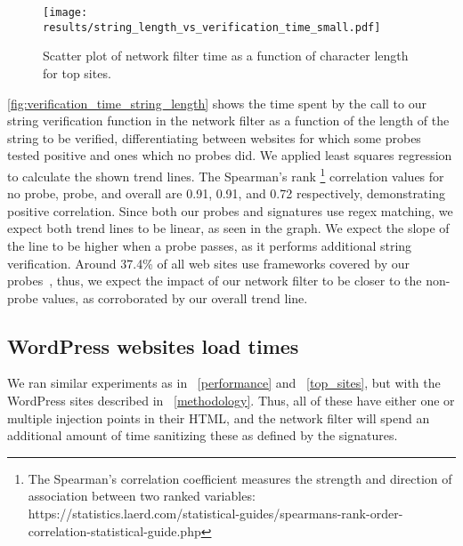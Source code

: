 \iffalse
\begin{figure}[h]
	\texttt{[image: results/density\_histogram\_filter\_slowdown\_small.pdf]}
	\caption{Density histogram of network filter slowdown for top sites.}
	\label{fig:histogram_slowdown}
\end{figure}


Figure ~\ref{fig:histogram_slowdown} shows a closer look at the distribution for the cold network filter slowdown on the top sites (same values as in \autoref{fig:overall_slowdown}). For this component, 87.6\% of the slowdown values are less than 10\%.
\fi

\begin{figure}[h]
	\texttt{[image: results/string\_length\_vs\_verification\_time\_small.pdf]}
	\caption{Scatter plot of network filter time as a function of character length for top sites.}
	\label{fig:verification_time_string_length}
\end{figure}

 \autoref{fig:verification_time_string_length} shows the time spent by the call to our string verification function in the network filter as a function of the length of the string to be verified, differentiating between websites for which some probes tested positive and ones which no probes did. We applied least squares regression to calculate the shown trend lines. The Spearman's rank \footnote{The Spearman's correlation coefficient measures the strength and direction of association between two ranked variables: https://statistics.laerd.com/statistical-guides/spearmans-rank-order-correlation-statistical-guide.php} correlation values for no probe, probe, and overall are 0.91, 0.91, and 0.72 respectively, demonstrating positive correlation. Since both our probes and signatures use regex matching, we expect both trend lines to be linear, as seen in the graph. We expect the slope of the line to be higher when a probe passes, as it performs additional string verification. Around 37.4\% of all web sites use frameworks covered by our probes~\cite{w3stats}, thus, we expect the impact of our network filter to be closer to the non-probe values, as corroborated by our overall trend line.

\subsection{WordPress websites load times} \label{wordpress_sites}

We ran similar experiments as in ~\autoref{performance} and ~\autoref{top_sites}, but with the WordPress sites described in ~\autoref{methodology}. Thus, all of these have either one or multiple injection points in their HTML, and the network filter will spend an additional amount of time sanitizing these as defined by the signatures.

